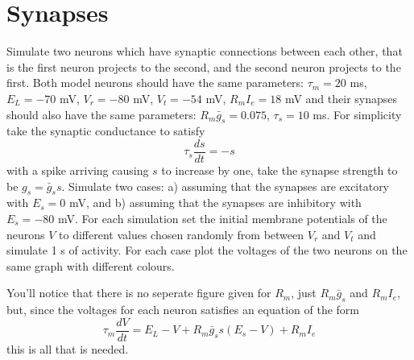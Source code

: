 \documentclass[12pt]{article}
\begin{document}
\section*{Synapses}

Simulate two neurons which have synaptic connections between each
other, that is the first neuron projects to the second, and the second
neuron projects to the first. Both model neurons should have the same
parameters: $\tau_m = 20$ ms, $E_L = -70$ mV, $V_r = -80$ mV, $V_t =
-54$ mV, $R_mI_e = 18$ mV and their synapses should also have the same
parameters: $R_m \bar{g}_s = 0.075$, $\tau_s= 10$ ms. For simplicity
take the synaptic conductance to satisfy
\begin{equation}
\tau_s\frac{ds}{dt}=-s
\end{equation}
with a spike arriving causing $s$ to increase by one, take the synapse
strength to be $g_s=\bar{g}_s s$. Simulate two cases: a) assuming that
the synapses are excitatory with $E_s = 0$ mV, and b) assuming that
the synapses are inhibitory with $E_s = -80$ mV. For each simulation
set the initial membrane potentials of the neurons $V$ to different
values chosen randomly from between $V_r$ and $V_t$ and simulate 1 s
of activity. For each case plot the voltages of the two neurons on the
same graph with different colours.

You'll notice that there is no seperate figure given for $R_m$, just
$R_m \bar{g}_s$ and $R_m I_e$, but, since the voltages for each neuron
satisfies an equation of the form
\begin{equation}
  \tau_m \frac{dV}{dt}= E_L-V+R_m\bar{g}_s s(E_s-V)+R_mI_e
\end{equation}
this is all that is needed.
\end{document}
